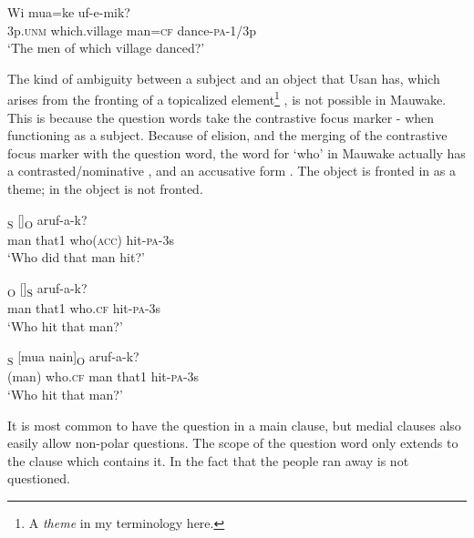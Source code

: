 \ea%
\label{ex:x1174}
\gll Wi    mua=ke  uf-e-mik? \\
3p.\textsc{unm}  which.village  man=\textsc{cf}  dance-\textsc{pa}-1/3p      \\
\glt `The men of which village danced?'
\z





The kind of ambiguity between a subject and an object that Usan has, which arises from the fronting of a topicalized element\footnote{A \textit{theme} in my terminology here.} \citep[294]{Reesink1987}, is not possible in Mauwake. This is because the question words take the contrastive focus marker \nobreakdash-  when functioning as a subject. Because of elision, and the merging of the contrastive focus marker with the question word, the word for `who' in Mauwake actually has a contrasted/nominative ,  and an accusative form . The object is fronted in  as a theme; in  the object is not fronted.

\ea%
\label{ex:x1170}
\textsubscript{S}  []\textsubscript{O}  aruf-a-k? \\
man  that1  who(\textsc{acc})  hit-\textsc{pa}-3s      \\
\glt `Who did that man hit?'
\z





\ea%
\label{ex:x1171}
\textsubscript{O}  []\textsubscript{S}  aruf-a-k? \\
man  that1  who.\textsc{cf}  hit-\textsc{pa}-3s      \\
\glt `Who hit that man?'
\z





\ea%
\label{ex:x1172}
\textsubscript{S}  [mua  nain]\textsubscript{O}  aruf-a-k? \\
(man)  who.\textsc{cf}  man  that1  hit-\textsc{pa}-3s      \\
\glt `Who hit that man?'
\z





It is most common to have the question in a main clause, but medial clauses also easily allow non-polar questions. The scope of the question word only extends to the clause which contains it. In  the fact that the people ran away is not questioned.

